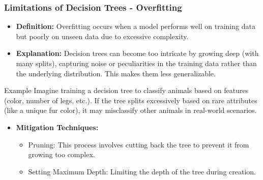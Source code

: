 \documentclass[aspectratio=169]{beamer}
\begin{document}
\begin{frame}[fragile]
  \frametitle{Limitations of Decision Trees - Overfitting}
  \begin{itemize}
    \item \textbf{Definition:} Overfitting occurs when a model performs well on training data but poorly on unseen data due to excessive complexity.
    \item \textbf{Explanation:} Decision trees can become too intricate by growing deep (with many splits), capturing noise or peculiarities in the training data rather than the underlying distribution. This makes them less generalizable.
  \end{itemize}

  \begin{block}{Example}
    Imagine training a decision tree to classify animals based on features (color, number of legs, etc.). If the tree splits excessively based on rare attributes (like a unique fur color), 
    it may misclassify other animals in real-world scenarios.
  \end{block}

  \begin{itemize}
    \item \textbf{Mitigation Techniques:}
      \begin{itemize}
        \item Pruning: This process involves cutting back the tree to prevent it from growing too complex.
        \item Setting Maximum Depth: Limiting the depth of the tree during creation.
      \end{itemize}
  \end{itemize}
\end{frame}
\end{document}
